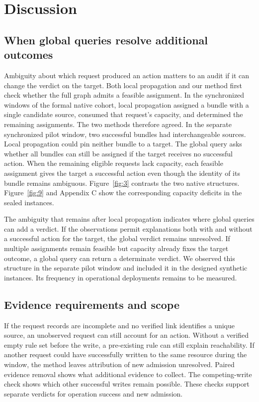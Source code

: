 \section{Discussion}\label{discussion}

\subsection{When global queries resolve additional outcomes}\label{when-global-queries-resolve-additional-outcomes}

Ambiguity about which request produced an action matters to an audit if it can change the verdict on the target. Both local propagation and our method first check whether the full graph admits a feasible assignment. In the synchronized windows of the formal native cohort, local propagation assigned a bundle with a single candidate source, consumed that request's capacity, and determined the remaining assignments. The two methods therefore agreed. In the separate synchronized pilot window, two successful bundles had interchangeable sources. Local propagation could pin neither bundle to a target. The global query asks whether all bundles can still be assigned if the target receives no successful action. When the remaining eligible requests lack capacity, each feasible assignment gives the target a successful action even though the identity of its bundle remains ambiguous. Figure~\ref{fig:3} contrasts the two native structures. Figure~\ref{fig:9} and Appendix C show the corresponding capacity deficits in the sealed instances.

The ambiguity that remains after local propagation indicates where global queries can add a verdict. If the observations permit explanations both with and without a successful action for the target, the global verdict remains unresolved. If multiple assignments remain feasible but capacity already fixes the target outcome, a global query can return a determinate verdict. We observed this structure in the separate pilot window and included it in the designed synthetic instances. Its frequency in operational deployments remains to be measured.

\subsection{Evidence requirements and scope}\label{evidence-requirements-and-scope}

If the request records are incomplete and no verified link identifies a unique source, an unobserved request can still account for an action. Without a verified empty rule set before the write, a pre-existing rule can still explain reachability. If another request could have successfully written to the same resource during the window, the method leaves attribution of new admission unresolved. Paired evidence removal shows what additional evidence to collect. The competing-write check shows which other successful writes remain possible. These checks support separate verdicts for operation success and new admission.

